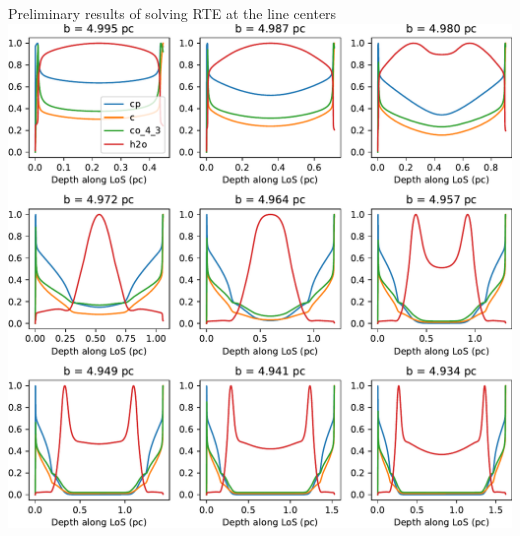 \documentclass[10pt,dvipsnames,hyperref={colorlinks=false}]{beamer}
\newcommand{\backupend}{
   \setcounter{framenumber}{\value{finalframe}}
}
\begin{document}
\begin{frame}{Preliminary results of solving RTE at the line centers}
    \centering
    \includegraphics[width=\textwidth,height=.85\textheight,keepaspectratio]{rte_comparison.pdf}
\end{frame}

\backupend
\end{document}
